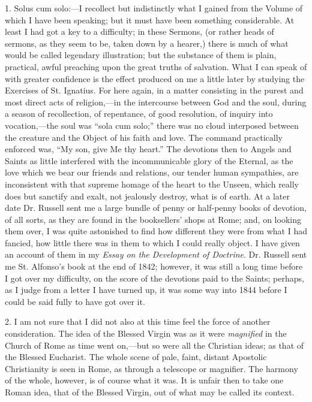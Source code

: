 1. Solus
cum solo:—I recollect but indistinctly what I gained from the Volume of which I have been
speaking; but it
must have been something considerable. At least I
had got a key to a difficulty; in these Sermons, (or rather heads of
sermons, as they seem to be, taken down by a hearer,) there is much of
what would be called legendary illustration; but the substance of them
is plain, practical, awful preaching upon the great truths of salvation.
What I can speak of with greater confidence is the effect produced on me a little later by studying the Exercises of St. Ignatius. For here again, in a matter
consisting in the purest and most
direct acts of religion,—in the intercourse between
God and the soul, during a season of recollection, of repentance, of
good resolution, of inquiry into vocation,—the soul was ``sola
cum solo;'' there was no cloud interposed between the creature and
the Object of his faith and love. The command practically enforced was,
``My son, give Me thy heart.'' The devotions then to Angels and
Saints as little interfered with the incommunicable
glory of the Eternal, as the love which we bear our friends and
relations, our tender human sympathies, are inconsistent with that
supreme homage of the heart to the Unseen, which really does but
sanctify and exalt, not jealously destroy, what is of earth. At
a later date Dr. Russell sent me a large bundle of penny or half-penny
books of devotion, of all sorts, as they are found in the booksellers'
shops at Rome; and, on looking them over, I was quite astonished to find
how different they were from what I had fancied, how little there was in
them to which I could really object. I have given an account of them in
my \emph{Essay on the Development of Doctrine}. Dr. Russell sent me St. Alfonso's book at the end of 1842; however, it was still a long time before I
got over my difficulty, on the score of the devotions paid to the
Saints; perhaps, as I judge from a letter I have turned up, it was some
way into 1844 before I could be said fully to have got over it.

2. I am not sure that I did not also at this time feel
the force of another consideration. The idea of the Blessed Virgin was as it were
\emph{magnified} in the
Church of Rome as time went on,—but so were all the Christian ideas;
as that of the Blessed Eucharist. The whole scene of pale, faint,
distant Apostolic Christianity is seen in Rome, as through a telescope
or magnifier. The harmony of the whole, however, is of course what it
was. It is unfair then to take one Roman idea, that of the Blessed
Virgin, out of what may be called its context.

